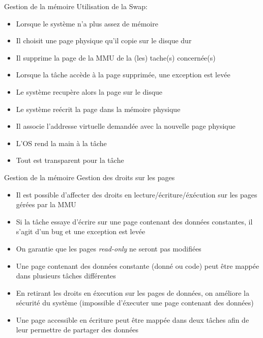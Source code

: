 \begin{frame}{Gestion de la mémoire}
  Utilisation de la Swap:
  \begin{itemize}
  \item Lorsque le système n'a plus assez de mémoire
  \item Il choisit une page physique qu'il copie sur le disque dur
  \item  Il  supprime  la  page   de  la  MMU  de  la  (les)  tache(s)
    concernée(s)
  \item Lorsque la tâche accède à la page supprimée, une exception est
    levée
  \item Le système recupère alors la page sur le disque
  \item Le système reécrit la page dans la mémoire physique
  \item Il associe l'addresse virtuelle demandée avec la nouvelle page
    physique
  \item L'OS rend la main à la tâche
  \item Tout est transparent pour la tâche
  \end{itemize}
\end{frame}

\begin{frame}{Gestion de la mémoire}
  Gestion des droits sur les pages
  \begin{itemize}
  \item    Il    est     possible    d'affecter    des    droits    en
    lecture/écriture/éxécution sur les pages gérées par la MMU
  \item Si la tâche essaye d'écrire sur une page contenant des données
    constantes, il s'agit d'un bug et une exception est levée
  \item  On garantie  que  les pages  \emph{read-only}  ne seront  pas
    modifiées
  \item Une page contenant des  données constante (donné ou code) peut
    être mappée dans plusieurs tâches différentes
  \item En retirant les droits  en éxecution sur les pages de données,
    on améliore la sécurité du système (impossible d'éxecuter une page
    contenant des données)
  \item Une  page accessible  en écriture peut  être mappée  dans deux
    tâches afin de leur permettre de partager des données
  \end{itemize} 
\end{frame}

